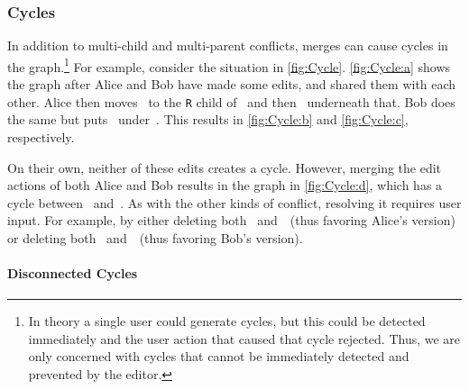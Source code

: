 

\subsubsection{Cycles}%
\label{sub:Multi-User Cycles}

\figureCycle{}

In addition to multi-child and multi-parent conflicts, merges
can cause cycles in the graph.\footnote{In theory a single user could
generate cycles, but this could be detected immediately and the user action
that caused that cycle rejected.
Thus, we are only concerned with cycles that cannot be immediately detected
and prevented by the editor.}
For example, consider the situation in \autoref{fig:Cycle}.
\autoref{fig:Cycle:a} shows the graph after Alice and Bob have made some edits,
and shared them with each other.
Alice then moves~\vMultiCycleTimes{} to the \texttt{R} child of~\vWrapPlus{}
and then~\vMultiCyclePlus{} underneath that.
Bob does the same but puts~\vMultiCycleTimes{} under~\vMultiCyclePlus{}.
This results in \autoref{fig:Cycle:b} and \autoref{fig:Cycle:c}, respectively.

On their own, neither of these edits creates a cycle.
However, merging the edit actions of both Alice and Bob results in the graph
in \autoref{fig:Cycle:d}, which has a cycle
between~\vMultiCycleTimes{} and~\vMultiCyclePlus{}.
As with the other kinds of conflict, resolving it requires user input.
For example, by either deleting both~\eMultiCycleBobPlus{} and~\eMultiCycleBobTimes{}~(thus favoring Alice's version)
or deleting both~\eMultiCycleAliceTimes{} and~\eMultiCycleAlicePlus{}~(thus favoring Bob's version).

\paragraph{Disconnected Cycles}

